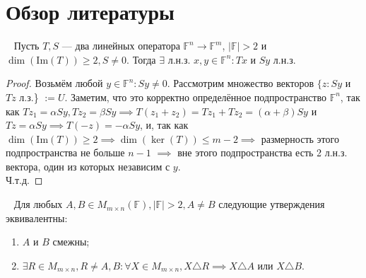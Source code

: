 \documentclass{article}
\begin{document}
\section{Обзор литературы} \label{lit}
\begin{lemma}~\cite[лемма 2.1]{art1} \label{lem:1}
Пусть $T, S$ — два линейных оператора $\mathbb{F}^n \xrightarrow{} \mathbb{F}^m$, $|\mathbb{F}| > 2$ и $\dim(\mathrm{Im}(T)) \ge 2, S \ne 0$. Тогда $\exists$ л.н.з. $x, y \in \mathbb{F}^n : Tx$ и $Sy$ л.н.з.
\end{lemma}
\begin{proof}
Возьмём любой $y \in \mathbb F^n : Sy \ne 0$. 
Рассмотрим множество векторов $\{z: Sy$ и $Tz$ л.з.\} $:=U$. Заметим, что это корректно определённое подпространство $\mathbb{F}^n$, так как $Tz_1 = \alpha Sy, Tz_2 = \beta Sy \implies T(z_1 + z_2) = Tz_1 + Tz_2 = (\alpha + \beta)Sy$ и $Tz = \alpha Sy \implies T(-z) = -\alpha Sy$, и, так как $\dim(\mathrm{Im}(T)) \ge 2 \implies \dim(\ker(T)) \le m - 2 \implies$ размерность этого подпространства не больше $n - 1$ $\implies$ вне этого подпространства есть 2 л.н.з. вектора, один из которых независим с $y$. \\
Ч.т.д.
\end{proof}

\begin{theorem}~\cite[предложение 2.2]{art1} \label{prop1.2.2}
Для любых $A, B \in M_{m \times n}(\mathbb{F}), |\mathbb{F}| > 2, A \not= B$ следующие утверждения эквивалентны:
\begin{enumerate}
  \item $A$ и $B$ смежны;
  \item $\exists R \in M_{m \times n}, R \not= A, B: \forall X \in M_{m \times n}, X \triangle R \implies X \triangle A$ или $X \triangle B$.
\end{enumerate}
\end{theorem} 
\end{document}

